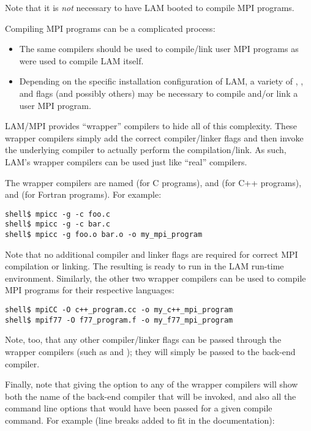 Note that it is {\em not} necessary to have LAM booted to compile MPI
programs.

Compiling MPI programs can be a complicated process:

\begin{itemize}
\item The same compilers should be used to compile/link user MPI
  programs as were used to compile LAM itself.
  
\item Depending on the specific installation configuration of LAM, a
  variety of , , and  flags (and
  possibly others) may be necessary to compile and/or link a user MPI
  program.
\end{itemize}

LAM/MPI provides ``wrapper'' compilers to hide all of this complexity.
These wrapper compilers simply add the correct compiler/linker flags
and then invoke the underlying compiler to actually perform the
compilation/link.  As such, LAM's wrapper compilers can be used just
like ``real'' compilers.

The wrapper compilers are named  (for C programs),
 and  (for C++ programs), and 
(for Fortran programs).  For example:

\lstset{style=lam-cmdline}
\begin{lstlisting}
shell$ mpicc -g -c foo.c
shell$ mpicc -g -c bar.c
shell$ mpicc -g foo.o bar.o -o my_mpi_program
\end{lstlisting}

Note that no additional compiler and linker flags are required for
correct MPI compilation or linking.  The resulting
 is ready to run in the LAM run-time
environment.  Similarly, the other two wrapper compilers can be used
to compile MPI programs for their respective languages:

\lstset{style=lam-cmdline}
\begin{lstlisting}
shell$ mpiCC -O c++_program.cc -o my_c++_mpi_program
shell$ mpif77 -O f77_program.f -o my_f77_mpi_program
\end{lstlisting}

Note, too, that any other compiler/linker flags can be passed through
the wrapper compilers (such as  and ); they will
simply be passed to the back-end compiler.

Finally, note that giving the  option to any of the
wrapper compilers will show both the name of the back-end compiler
that will be invoked, and also all the command line options that would
have been passed for a given compile command.  For example (line
breaks added to fit in the documentation):

